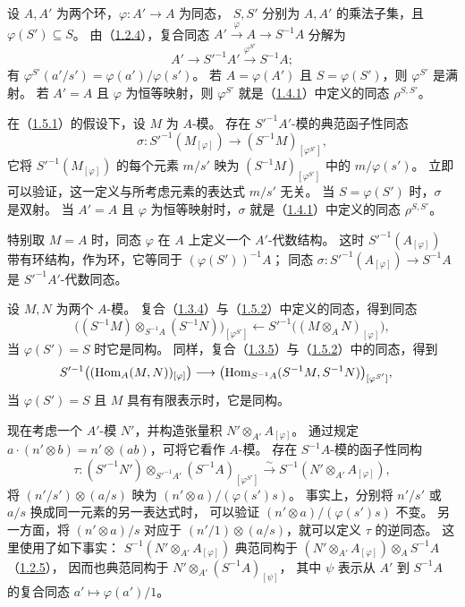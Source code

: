 设 $A,A'$ 为两个环，$\varphi\colon A'\to A$ 为同态，
$S,S'$ 分别为 $A,A'$ 的乘法子集，且 $\varphi(S')\subseteq S$。
由（\hyperlink{para:0:1.2.4}{1.2.4}），复合同态 $A'\xrightarrow{\varphi}A\to S^{-1}A$ 分解为
\[
 A'\longrightarrow S'^{-1}A'\xrightarrow{\varphi^{S'}}S^{-1}A;
\]
有 $\varphi^{S'}(a'/s')=\varphi(a')/\varphi(s')$。
若 $A=\varphi(A')$ 且 $S=\varphi(S')$，则 $\varphi^{S'}$ 是满射。
若 $A'=A$ 且 $\varphi$ 为恒等映射，则 $\varphi^{S'}$ 就是（\hyperlink{para:0:1.4.1}{1.4.1}）中定义的同态 $\rho^{S,S'}$。

在（\hyperlink{para:0:1.5.1}{1.5.1}）的假设下，设 $M$ 为 $A$-模。
存在 $S'^{-1}A'$-模的典范函子性同态
\[
 \sigma\colon S'^{-1}(M_{[\varphi]})\longrightarrow
 (S^{-1}M)_{[\varphi^{S'}]},
\]
它将 $S'^{-1}(M_{[\varphi]})$ 的每个元素 $m/s'$ 映为
$(S^{-1}M)_{[\varphi^{S'}]}$ 中的 $m/\varphi(s')$。
立即可以验证，这一定义与所考虑元素的表达式 $m/s'$ 无关。
当 $S=\varphi(S')$ 时，$\sigma$ 是双射。
当 $A'=A$ 且 $\varphi$ 为恒等映射时，$\sigma$ 就是（\hyperlink{para:0:1.4.1}{1.4.1}）中定义的同态 $\rho^{S,S'}$。

特别取 $M=A$ 时，同态 $\varphi$ 在 $A$ 上定义一个 $A'$-代数结构。
这时 $S'^{-1}(A_{[\varphi]})$ 带有环结构，作为环，它等同于 $(\varphi(S'))^{-1}A$；
同态 $\sigma\colon S'^{-1}(A_{[\varphi]})\to S^{-1}A$ 是 $S'^{-1}A'$-代数同态。

设 $M,N$ 为两个 $A$-模。
复合（\hyperlink{para:0:1.3.4}{1.3.4}）与（\hyperlink{para:0:1.5.2}{1.5.2}）中定义的同态，得到同态
\[
 \bigl((S^{-1}M)\otimes_{S^{-1}A}(S^{-1}N)\bigr)_{[\varphi^{S'}]}
 \longleftarrow S'^{-1}\bigl((M\otimes_A N)_{[\varphi]}\bigr),
\]
当 $\varphi(S')=S$ 时它是同构。
同样，复合（\hyperlink{para:0:1.3.5}{1.3.5}）与（\hyperlink{para:0:1.5.2}{1.5.2}）中的同态，得到
\[
 \begin{split}
 S'^{-1}\bigl((\operatorname{Hom}_A(M,N))_{[\varphi]}\bigr)
 \longrightarrow{}&\bigl(\operatorname{Hom}_{S^{-1}A}(S^{-1}M,S^{-1}N)\bigr)_{[\varphi^{S'}]},
 \end{split}
\]
当 $\varphi(S')=S$ 且 $M$ 具有有限表示时，它是同构。

现在考虑一个 $A'$-模 $N'$，并构造张量积 $N'\otimes_{A'}A_{[\varphi]}$。
通过规定 $a\cdot(n'\otimes b)=n'\otimes(ab)$，可将它看作 $A$-模。
存在 $S^{-1}A$-模的函子性同构
\[
 \tau\colon (S'^{-1}N')\otimes_{S'^{-1}A'}(S^{-1}A)_{[\varphi^{S'}]}
 \xrightarrow{\sim} S^{-1}(N'\otimes_{A'}A_{[\varphi]}),
\]
将 $(n'/s')\otimes(a/s)$ 映为 $(n'\otimes a)/(\varphi(s')s)$。
事实上，分别将 $n'/s'$ 或 $a/s$ 换成同一元素的另一表达式时，
可以验证 $(n'\otimes a)/(\varphi(s')s)$ 不变。
另一方面，将 $(n'\otimes a)/s$ 对应于 $(n'/1)\otimes(a/s)$，就可以定义 $\tau$ 的逆同态。
这里使用了如下事实：
$S^{-1}(N'\otimes_{A'}A_{[\varphi]})$ 典范同构于
$(N'\otimes_{A'}A_{[\varphi]})\otimes_A S^{-1}A$（\hyperlink{para:0:1.2.5}{1.2.5}），
因而也典范同构于 $N'\otimes_{A'}(S^{-1}A)_{[\psi]}$，
其中 $\psi$ 表示从 $A'$ 到 $S^{-1}A$ 的复合同态 $a'\mapsto\varphi(a')/1$。

